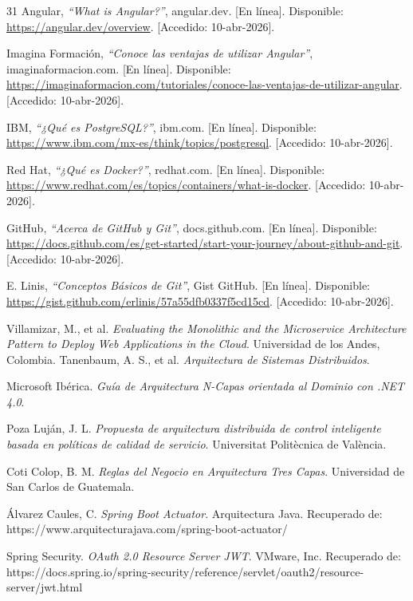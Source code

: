 \begin{thebibliography}{31}
Angular, \textit{``What is Angular?''}, angular.dev. [En línea]. Disponible: \url{https://angular.dev/overview}. [Accedido: 10-abr-2026].

Imagina Formación, \textit{``Conoce las ventajas de utilizar Angular''}, imaginaformacion.com. [En línea]. Disponible: \url{https://imaginaformacion.com/tutoriales/conoce-las-ventajas-de-utilizar-angular}. [Accedido: 10-abr-2026].

IBM, \textit{``¿Qué es PostgreSQL?''}, ibm.com. [En línea]. Disponible: \url{https://www.ibm.com/mx-es/think/topics/postgresql}. [Accedido: 10-abr-2026].

Red Hat, \textit{``¿Qué es Docker?''}, redhat.com. [En línea]. Disponible: \url{https://www.redhat.com/es/topics/containers/what-is-docker}. [Accedido: 10-abr-2026].

GitHub, \textit{``Acerca de GitHub y Git''}, docs.github.com. [En línea]. Disponible: \url{https://docs.github.com/es/get-started/start-your-journey/about-github-and-git}. [Accedido: 10-abr-2026].

E. Linis, \textit{``Conceptos Básicos de Git''}, Gist GitHub. [En línea]. Disponible: \url{https://gist.github.com/erlinis/57a55dfb0337f5cd15cd}. [Accedido: 10-abr-2026].

Villamizar, M., et al. \textit{Evaluating the Monolithic and the Microservice Architecture Pattern to Deploy Web Applications in the Cloud}. Universidad de los Andes, Colombia.
Tanenbaum, A. S., et al. \textit{Arquitectura de Sistemas Distribuidos}.

Microsoft Ibérica. \textit{Guía de Arquitectura N-Capas orientada al Dominio con .NET 4.0}.

Poza Luján, J. L. \textit{Propuesta de arquitectura distribuida de control inteligente basada en políticas de calidad de servicio}. Universitat Politècnica de València.

Coti Colop, B. M. \textit{Reglas del Negocio en Arquitectura Tres Capas}. Universidad de San Carlos de Guatemala.

Álvarez Caules, C. \textit{Spring Boot Actuator}. Arquitectura Java. Recuperado de: https://www.arquitecturajava.com/spring-boot-actuator/

Spring Security. \textit{OAuth 2.0 Resource Server JWT}. VMware, Inc. Recuperado de: https://docs.spring.io/spring-security/reference/servlet/oauth2/resource-server/jwt.html


\end{thebibliography}

